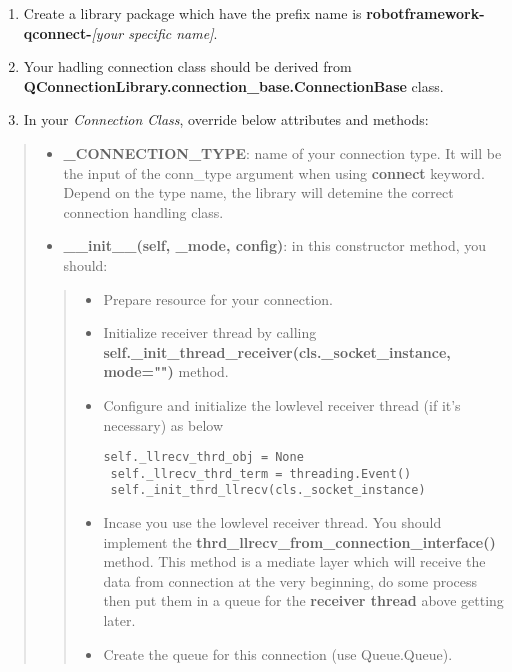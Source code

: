 \begin{enumerate}
\def\labelenumi{\arabic{enumi}.}
\tightlist
\item
  Create a library package which have the prefix name is
  \textbf{robotframework-qconnect-}\emph{{[}your specific name{]}}.
\item
  Your hadling connection class should be derived from
  \textbf{QConnectionLibrary.connection\_base.ConnectionBase} class.
\item
  In your \emph{Connection Class}, override below attributes and
  methods:
\end{enumerate}

\begin{quote}
\begin{itemize}
\tightlist
\item
  \textbf{\_CONNECTION\_TYPE}: name of your connection type. It will be
  the input of the conn\_type argument when using \textbf{connect}
  keyword. Depend on the type name, the library will detemine the
  correct connection handling class.
\item
  \textbf{\_\_init\_\_(self, \_mode, config)}: in this constructor
  method, you should:
\end{itemize}

\begin{quote}
\begin{itemize}
\item
  Prepare resource for your connection.
\item
  Initialize receiver thread by calling
  \textbf{self.\_init\_thread\_receiver(cls.\_socket\_instance,
  mode="")} method.
\item
  Configure and initialize the lowlevel receiver thread (if it's
  necessary) as below

\begin{verbatim}
self._llrecv_thrd_obj = None
 self._llrecv_thrd_term = threading.Event()
 self._init_thrd_llrecv(cls._socket_instance)
\end{verbatim}
\item
  Incase you use the lowlevel receiver thread. You should implement the
  \textbf{thrd\_llrecv\_from\_connection\_interface()} method. This
  method is a mediate layer which will receive the data from connection
  at the very beginning, do some process then put them in a queue for
  the \textbf{receiver thread} above getting later.
\item
  Create the queue for this connection (use Queue.Queue).
\end{itemize}
\end{quote}


\end{quote}
